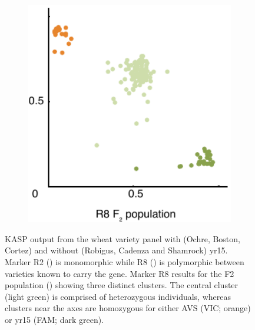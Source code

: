\begin{figure}[b!]
\begin{subfigure}{0.31\textwidth}
\end{subfigure}
~
\begin{subfigure}{0.31\textwidth}
\caption{}
\label{fig:yr15:r8f2}
\includegraphics[width=1\textwidth]{Yr15/Figures/selection/R8F2.pdf}
\end{subfigure}

\caption[KASP output from the wheat variety panel]{KASP output from the wheat variety panel with (Ochre, Boston, Cortez) and without (Robigus, Cadenza and Shamrock) \acrshort{yr15}. Marker  R2 () is monomorphic while R8 ()  is polymorphic between varieties known to carry the gene.  Marker R8 results for the F2 population () showing three distinct clusters. The central cluster (light green) is comprised of heterozygous individuals, whereas clusters near the axes are homozygous for either AVS (VIC; orange) or \acrshort{yr15} (FAM; dark green).}
\end{figure}


